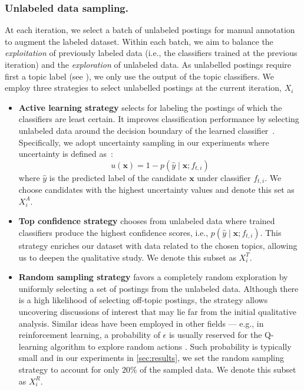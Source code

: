 \subsubsection{Unlabeled data sampling.}\label{sssec:sampling_process}
At each iteration, we select a batch of unlabeled postings for manual annotation to augment the labeled dataset.
Within each batch, we aim to balance the \emph{exploitation} of previously labeled data (i.e., the classifiers trained at the previous iteration) and the \emph{exploration} of unlabeled data.
As unlabelled postings require first a topic label (see ), we only use the output of the topic classifiers.
We employ three strategies to select unlabelled postings at the current iteration, $X_i$
\begin{itemize}
    \item \textbf{Active learning strategy} selects for labeling the postings of which the classifiers are least certain.
    It improves classification performance by selecting unlabeled data around the decision boundary of the learned classifier~\citep{settles2012active}.
    Specifically, we adopt uncertainty sampling in our experiments where uncertainty is defined as~\citep{tran2018combining}:
      \begin{equation}
          u(\pmb{x}) = 1 - p(\hat{y} \mid \pmb{x}; f_{t,i})
      \end{equation}
    where $\hat{y}$ is the predicted label of the candidate $\pmb{x}$ under classifier $f_{t,i}$. We choose candidates with the highest uncertainty values and denote this set as $X_i^{A}$.
    \item \textbf{Top confidence strategy} chooses from unlabeled data where trained classifiers produce the highest confidence scores, i.e., $p(\hat{y} \mid \pmb{x}; f_{t,i})$. This strategy enriches our dataset with data related to the chosen topics, allowing us to deepen the qualitative study. We denote this subset as $X_i^{T}$.
    \item \textbf{Random sampling strategy} favors a completely random exploration by uniformly selecting a set of postings from the unlabeled data.
    Although there is a high likelihood of selecting off-topic postings, the strategy allows uncovering discussions of interest that may lie far from the initial qualitative analysis.
    Similar ideas have been employed in other fields --- e.g., in reinforcement learning, a probability of $\epsilon$ is usually reserved for the Q-learning algorithm to explore random actions \citep{mnih2013playing}.
    Such probability is typically small and in our experiments in \cref{sec:results}, we set the random sampling strategy to account for only $20\%$ of the sampled data.
    We denote this subset as $X_i^{R}$.
\end{itemize}

